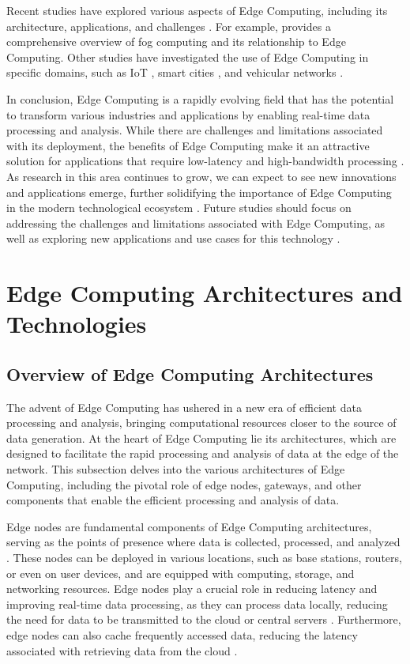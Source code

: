 \documentclass[11pt,a4paper]{article}
\begin{document}
Recent studies have explored various aspects of Edge Computing, including its architecture, applications, and challenges \cite{arxiv:1911.02794}. For example, \cite{arxiv:1808.05283} provides a comprehensive overview of fog computing and its relationship to Edge Computing. Other studies have investigated the use of Edge Computing in specific domains, such as IoT \cite{arxiv:2402.13056}, smart cities \cite{arxiv:1909.08747}, and vehicular networks \cite{arxiv:1908.06849}.

In conclusion, Edge Computing is a rapidly evolving field that has the potential to transform various industries and applications by enabling real-time data processing and analysis. While there are challenges and limitations associated with its deployment, the benefits of Edge Computing make it an attractive solution for applications that require low-latency and high-bandwidth processing \cite{arxiv:2112.01250}. As research in this area continues to grow, we can expect to see new innovations and applications emerge, further solidifying the importance of Edge Computing in the modern technological ecosystem \cite{arxiv:2109.12195}. Future studies should focus on addressing the challenges and limitations associated with Edge Computing, as well as exploring new applications and use cases for this technology \cite{arxiv:1909.00560}.


\section{Edge Computing Architectures and Technologies}



\subsection{Overview of Edge Computing Architectures}


The advent of Edge Computing has ushered in a new era of efficient data processing and analysis, bringing computational resources closer to the source of data generation. At the heart of Edge Computing lie its architectures, which are designed to facilitate the rapid processing and analysis of data at the edge of the network. This subsection delves into the various architectures of Edge Computing, including the pivotal role of edge nodes, gateways, and other components that enable the efficient processing and analysis of data.

Edge nodes are fundamental components of Edge Computing architectures, serving as the points of presence where data is collected, processed, and analyzed \cite{arxiv:1611.05539}. These nodes can be deployed in various locations, such as base stations, routers, or even on user devices, and are equipped with computing, storage, and networking resources. Edge nodes play a crucial role in reducing latency and improving real-time data processing, as they can process data locally, reducing the need for data to be transmitted to the cloud or central servers \cite{arxiv:1701.01090}. Furthermore, edge nodes can also cache frequently accessed data, reducing the latency associated with retrieving data from the cloud \cite{arxiv:1810.13287}.
\end{document}
